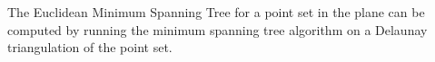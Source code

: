 


The Euclidean Minimum Spanning Tree for a point set in the plane can be
computed by running the minimum spanning tree algorithm on a Delaunay
triangulation of the point set.






